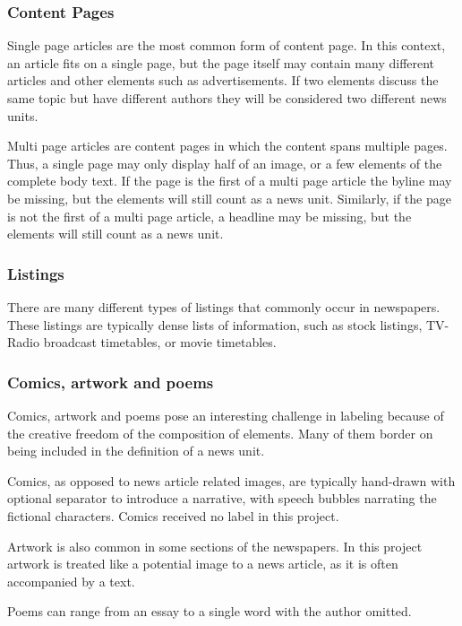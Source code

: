 \documentclass[english, bibtex]{kththesis}
\begin{document}
\subsubsection{Content Pages}

Single page articles are the most common form of content page. In this context, an article fits on a single page, but the page itself may contain many different articles and other elements such as advertisements. If two elements discuss the same topic but have different authors they will be considered two different news units.

Multi page articles are content pages in which the content spans multiple pages. Thus, a single page may only display half of an image, or a few elements of the complete body text. If the page is the first of a multi page article the byline may be missing, but the elements will still count as a news unit. Similarly, if the page is not the first of a multi page article, a headline may be missing, but the elements will still count as a news unit.

\subsubsection{Listings}

There are many different types of listings that commonly occur in newspapers. These listings are typically dense lists of information, such as stock listings, TV-Radio broadcast timetables, or movie timetables.

\subsubsection{Comics, artwork and poems}

Comics, artwork and poems pose an interesting challenge in labeling because of the creative freedom of the composition of elements. Many of them border on being included in the definition of a news unit.

Comics, as opposed to news article related images, are typically hand-drawn with optional separator to introduce a narrative, with speech bubbles narrating the fictional characters. Comics received no label in this project.

Artwork is also common in some sections of the newspapers. In this project artwork is treated like a potential image to a news article, as it is often accompanied by a text.

Poems can range from an essay to a single word with the author omitted.
\end{document}
